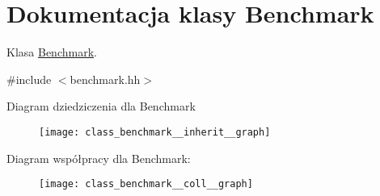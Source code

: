 \hypertarget{class_benchmark}{\section{Dokumentacja klasy Benchmark}
\label{class_benchmark}
}


Klasa \hyperlink{class_benchmark}{Benchmark}.  




{\ttfamily \#include $<$benchmark.\-hh$>$}



Diagram dziedziczenia dla Benchmark\nopagebreak
\begin{figure}[H]
\begin{center}
\leavevmode
\texttt{[image: class\_benchmark\_\_inherit\_\_graph]}
\end{center}
\end{figure}


Diagram współpracy dla Benchmark\-:\nopagebreak
\begin{figure}[H]
\begin{center}
\leavevmode
\texttt{[image: class\_benchmark\_\_coll\_\_graph]}
\end{center}
\end{figure}

